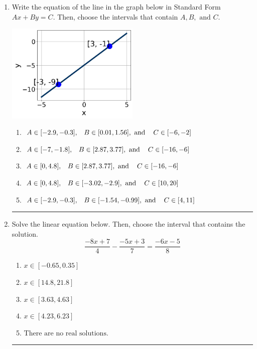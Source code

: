 \documentclass[14pt]{extbook}
\newcommand{\litem}[1]{\item#1\hspace*{-1cm}\rule{\textwidth}{0.4pt}}
\begin{document}
\begin{enumerate}
{\begin{enumerate}[label=\Alph*.]
\end{enumerate} }
\litem{
Write the equation of the line in the graph below in Standard Form $Ax+By=C$. Then, choose the intervals that contain $A, B, \text{ and } C$.
\begin{center}
    \includegraphics[width=0.5\textwidth]{../Figures/linearGraphToStandardCopyC.png}
\end{center}
\begin{enumerate}[label=\Alph*.]
\item \( A \in [-2.9, -0.3], \hspace{3mm} B \in [0.01, 1.56], \text{ and } \hspace{3mm} C \in [-6, -2] \)
\item \( A \in [-7, -1.8], \hspace{3mm} B \in [2.87, 3.77], \text{ and } \hspace{3mm} C \in [-16, -6] \)
\item \( A \in [0, 4.8], \hspace{3mm} B \in [2.87, 3.77], \text{ and } \hspace{3mm} C \in [-16, -6] \)
\item \( A \in [0, 4.8], \hspace{3mm} B \in [-3.02, -2.9], \text{ and } \hspace{3mm} C \in [10, 20] \)
\item \( A \in [-2.9, -0.3], \hspace{3mm} B \in [-1.54, -0.99], \text{ and } \hspace{3mm} C \in [4, 11] \)

\end{enumerate} }
\litem{
Solve the linear equation below. Then, choose the interval that contains the solution.\[ \frac{-8x + 7}{4} - \frac{-5x + 3}{7} = \frac{-6x -5}{8} \]\begin{enumerate}[label=\Alph*.]
\item \( x \in [-0.65, 0.35] \)
\item \( x \in [14.8, 21.8] \)
\item \( x \in [3.63, 4.63] \)
\item \( x \in [4.23, 6.23] \)
\item \( \text{There are no real solutions.} \)


\end{enumerate}}
\end{enumerate}
\end{document}

